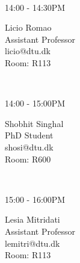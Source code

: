 \documentclass[10pt]{extarticle}
\begin{document}
\begin{center}
\begin{minipage}[t]{0.75\columnwidth}
\begin{minipage}[t]{0.3333333333333333\columnwidth}
            \vspace{0.01cm} \\
            \begin{minipage}[t]{0.3\columnwidth}
                14:00 - 14:30PM
            \end{minipage}%
            \begin{minipage}[t]{0.65\columnwidth}
                Licio Romao \\
                Assistant Professor \\
                licio@dtu.dk \\
                Room: R113 \\
            \end{minipage}
            \vspace{0.01cm} \\
            \begin{minipage}[t]{0.3\columnwidth}
                14:00 - 15:00PM
            \end{minipage}%
            \begin{minipage}[t]{0.65\columnwidth}
                Shobhit Singhal \\
                PhD Student \\
                shosi@dtu.dk \\
                Room: R600 \\
            \end{minipage}
            \vspace{0.01cm} \\
            \begin{minipage}[t]{0.3\columnwidth}
                15:00 - 16:00PM
            \end{minipage}%
            \begin{minipage}[t]{0.65\columnwidth}
                Lesia Mitridati \\
                Assistant Professor \\
                lemitri@dtu.dk \\
                Room: R113 \\
            \end{minipage}
            \vspace{0.01cm} \\
        \end{minipage}%
        \vrule width 1pt
        \vspace{0.01cm}
        \hspace{0.0cm}
            \begin{minipage}[t]{0.3333333333333333\columnwidth}

\end{minipage}
\end{minipage}
\end{center}
\end{document}
